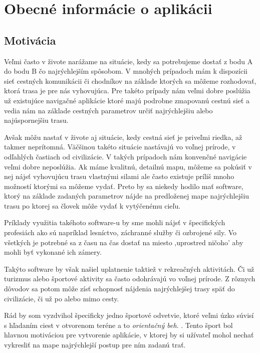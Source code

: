 \chapter{Obecné informácie o aplikácii}

\section{Motivácia}

Veľmi často v živote narážame na situácie, kedy sa potrebujeme dostať z bodu A do bodu B čo najrýchlejším spôsobom. V mnohých prípadoch mám k dispozícii sieť cestných komunikácii či chodníkov na základe ktorých sa môžeme rozhodovať, ktorá trasa je pre nás vyhovujúca. Pre takéto prípady nám veľmi dobre poslúžia už existujúce navigačné aplikácie ktoré majú podrobne zmapovanú cestnú sieť a vedia nám na základe cestných parametrov určiť najrýchlejšiu alebo najúspornejšiu trasu.

Avšak môžu nastať v živote aj situácie, kedy cestná sieť je priveľmi riedka, až takmer neprítomná. Väčšinou takéto situácie nastávajú vo voľnej prírode, v odľahlých častiach od civilizácie. V takých prípadoch nám konvenčné navigácie veľmi dobre neposlúžia. Ak máme kvalitnú, detailnú mapu, môžeme sa pokúsiť v nej nájsť vyhovujúcu trasu vlastnými silami ale často existuje príliš mnoho možností ktorými sa môžeme vydať. Preto by sa niekedy hodilo mať software, ktorý na základe zadaných parametrov nájde na predloženej mape najrýchlejšiu trasu po ktorej sa človek môže vydať k vytýčenému cieľu.

Príklady využitia takéhoto software-u by sme mohli nájsť v špecifických profesiách ako sú napríklad lesníctvo, záchranné služby či ozbrojené sily. Vo všetkých je potrebné sa z času na čas dostať na miesto ,uprostred ničoho' aby mohli byť vykonané ich zámery.

Takýto software by však našiel uplatnenie taktiež v rekreačných aktivitách. Či už turizmus alebo športové aktivity sa často odohrávajú vo voľnej prírode. Z rôznych dôvodov sa potom môže zísť schopnosť nájdenia najrýchlejšej trasy späť do civilizácie, či už po alebo mimo cesty. 

Rád by som vyzdvihol špecificky jedno športové odvetvie, ktoré veľmi úzko súvisí s hľadaním ciest v otvorenom teréne a to \textit{orientačný beh}. \cite{CoJeOrientak}. Tento šport bol hlavnou motiváciou pre vytvorenie aplikácie, v ktorej by si užívateľ mohol nechať vykresliť na mape najrýchlejší postup pre ním zadanú trať. 

